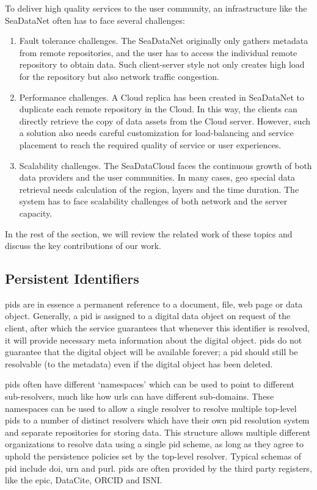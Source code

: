 \documentclass[conference]{IEEEtran}
\begin{document}
To deliver high quality services to the user community, an infrastructure like the SeaDataNet often has to face several challenges:
\begin{enumerate}
    \item Fault tolerance challenges. The SeaDataNet originally only gathers metadata from remote repositories, and the user has to access the individual remote repository to obtain data. Such client-server style not only creates high load for the repository but also network traffic congestion.
    \item Performance challenges. A Cloud replica has been created in SeaDataNet to duplicate each remote repository in the Cloud. In this way, the clients can directly retrieve the copy of data assets from the Cloud server. However, such a solution also needs careful customization for load-balancing and service placement to reach the required quality of service or user experiences.
    \item Scalability challenges. The SeaDataCloud faces the continuous growth of both data providers and the user communities. In many cases, geo special data retrieval needs calculation of the region, layers and the time duration. The system has to face scalability challenges of both network and the server capacity. 
\end{enumerate}
In the rest of the section, we will review the related work of these topics and discuss the key contributions of our work. 

\subsection{Persistent Identifiers}
\label{sec:pids}

\glspl{pid} are in essence a permanent reference to a document, file, web page or data object. Generally, a \gls{pid} is assigned to a digital data object on request of the client, after which the service guarantees that whenever this identifier is resolved, it will provide necessary meta information about the digital object. \glspl{pid} do not guarantee that the digital object will be available forever; a \gls{pid} should still be resolvable (to the metadata) even if the digital object has been deleted. 

\glspl{pid} often have different `namespaces' which can be used to point to different sub-resolvers, much like how \glspl{url} can have different sub-domains. These namespaces can be used to allow a single resolver to resolve multiple top-level \glspl{pid} to a number of distinct resolvers which have their own \gls{pid} resolution system and separate repositories for storing data. This structure allows multiple different organizations to resolve data using a single \gls{pid} scheme, as long as they agree to uphold the persistence policies set by the top-level resolver. Typical schemas of \gls{pid} include \gls{doi}, \gls{urn} and \gls{purl}. \glspl{pid} are often provided by the third party registers, like the \gls{epic}, DataCite, ORCID and ISNI. 
\end{document}
